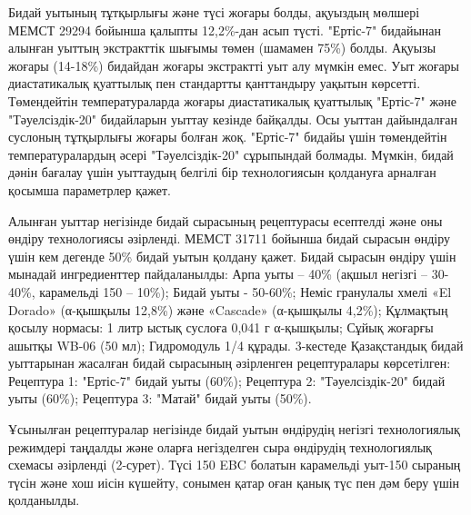 \begin{multicols}{2}
Бидай уытының тұтқырлығы және түсі жоғары болды, ақуыздың мөлшері МЕМСТ
29294 бойынша қалыпты 12,2\%-дан асып түсті. "Ертіс-7" бидайынан алынған
уыттың экстракттік шығымы төмен (шамамен 75\%) болды. Ақуызы жоғары
(14-18\%) бидайдан жоғары экстрактті уыт алу мүмкін емес. Уыт жоғары
диастатикалық қуаттылық пен стандартты қанттандыру уақытын көрсетті.
Төмендейтін температураларда жоғары диастатикалық қуаттылық "Ертіс-7"
және "Тәуелсіздік-20" бидайларын уыттау кезінде байқалды. Осы уыттан
дайындалған суслоның тұтқырлығы жоғары болған жоқ. "Ертіс-7" бидайы үшін
төмендейтін температуралардың әсері "Тәуелсіздік-20" сұрыпындай болмады.
Мүмкін, бидай дәнін бағалау үшін уыттаудың белгілі бір технологиясын
қолдануға арналған қосымша параметрлер қажет.

Алынған уыттар негізінде бидай сырасының рецептурасы есептелді және оны
өндіру технологиясы әзірленді. МЕМСТ 31711 бойынша бидай сырасын өндіру
үшін кем дегенде 50\% бидай уытын қолдану қажет. Бидай сырасын өндіру
үшін мынадай ингредиенттер пайдаланылды: Арпа уыты -- 40\% (ақшыл
негізгі -- 30-40\%, карамельді 150 -- 10\%); Бидай уыты - 50-60\%; Неміс
гранулалы хмелі «El Dorado» (α-қышқылы 12,8\%) және «Cascade» (α-қышқылы
4,2\%); Құлмақтың қосылу нормасы: 1 литр ыстық суслоға 0,041 г
α-қышқылы; Сұйық жоғарғы ашытқы WB-06 (50 мл); Гидромодуль 1/4 құрады.
3-кестеде Қазақстандық бидай уыттарынан жасалған бидай сырасының
әзірленген рецептуралары көрсетілген: Рецептура 1: "Ертіс-7" бидай уыты
(60\%); Рецептура 2: "Тәуелсіздік-20" бидай уыты (60\%); Рецептура 3:
"Матай" бидай уыты (50\%).

Ұсынылған рецептуралар негізінде бидай уытын өндірудің негізгі
технологиялық режимдері таңдалды және оларға негізделген сыра өндірудің
технологиялық схемасы әзірленді (2-сурет). Түсі 150 EBC болатын
карамельді уыт-150 сыраның түсін және хош иісін күшейту, сонымен қатар
оған қанық түс пен дәм беру үшін қолданылды.
\end{multicols}

